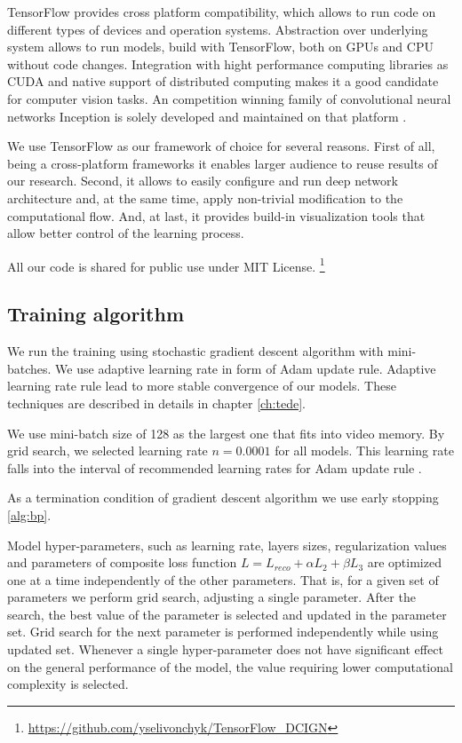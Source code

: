 TensorFlow provides cross platform compatibility, which allows to run code on different types of devices and operation systems.
Abstraction over underlying system allows to run models, build with TensorFlow, both on GPUs and CPU without code changes.
Integration with hight performance computing libraries as CUDA \cite{Nickolls2008} and native support of distributed computing makes it a good candidate for computer vision tasks.
An competition winning family of convolutional neural networks Inception is solely developed and maintained on that platform \cite{Szegedy2016}.

We use TensorFlow as our framework of choice for several reasons.
First of all, being a cross-platform frameworks it enables larger audience to reuse results of our research.
Second, it allows to easily configure and run deep network architecture and, at the same time, apply non-trivial modification to the computational flow.
And, at last, it provides build-in visualization tools that allow better control of the learning process.

All our code is shared for public use under MIT License.
\footnote{\url{https://github.com/yselivonchyk/TensorFlow_DCIGN}}

\subsection{Training algorithm}

We run the training using stochastic gradient descent algorithm with mini-batches.
We use adaptive learning rate in form of Adam update rule.
Adaptive learning rate rule lead to more stable convergence of our models.
These techniques are described in details in chapter \ref{ch:tede}.

We use mini-batch size of 128 as the largest one that fits into video memory.
By grid search, we selected learning rate $n=0.0001$ for all models. This learning rate falls into the interval of recommended learning rates for Adam update rule \cite{Kingma2015}.

As a termination condition of gradient descent algorithm we use early stopping \ref{alg:bp}.

Model hyper-parameters, such as learning rate, layers sizes, regularization values and parameters of composite loss function $L=L_{reco} + \alpha L_2 + \beta L_3$ are optimized one at a time independently of the other parameters.
That is, for a given set of parameters we perform grid search, adjusting a single parameter.
After the search, the best value of the parameter is selected and updated in the parameter set.
Grid search for the next parameter is performed independently while using updated set.
Whenever a single hyper-parameter does not have significant effect on the general performance of the model, the value requiring lower computational complexity is selected.

